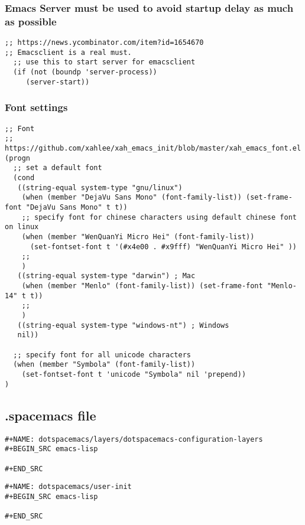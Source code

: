 \documentclass[11pt]{article}
\begin{document}
\subsubsection{Emacs Server must be used to avoid startup delay as much as possible}
\label{sec:org8786612}
\begin{verbatim}
;; https://news.ycombinator.com/item?id=1654670
;; Emacsclient is a real must.
  ;; use this to start server for emacsclient
  (if (not (boundp 'server-process))
     (server-start))
\end{verbatim}

\subsubsection{Font settings}
\label{sec:org4251fbf}
\begin{verbatim}
;; Font
;; https://github.com/xahlee/xah_emacs_init/blob/master/xah_emacs_font.el
(progn
  ;; set a default font
  (cond
   ((string-equal system-type "gnu/linux")
    (when (member "DejaVu Sans Mono" (font-family-list)) (set-frame-font "DejaVu Sans Mono" t t))
    ;; specify font for chinese characters using default chinese font on linux
    (when (member "WenQuanYi Micro Hei" (font-family-list))
      (set-fontset-font t '(#x4e00 . #x9fff) "WenQuanYi Micro Hei" ))
    ;;
    )
   ((string-equal system-type "darwin") ; Mac
    (when (member "Menlo" (font-family-list)) (set-frame-font "Menlo-14" t t))
    ;;
    )
   ((string-equal system-type "windows-nt") ; Windows
   nil))

  ;; specify font for all unicode characters
  (when (member "Symbola" (font-family-list))
    (set-fontset-font t 'unicode "Symbola" nil 'prepend))
)
\end{verbatim}


\subsection{.spacemacs file}
\label{sec:orgd433bf5}

\begin{verbatim}
#+NAME: dotspacemacs/layers/dotspacemacs-configuration-layers
#+BEGIN_SRC emacs-lisp
 
#+END_SRC
\end{verbatim}

\begin{verbatim}
#+NAME: dotspacemacs/user-init
#+BEGIN_SRC emacs-lisp

#+END_SRC
\end{verbatim}
\end{document}
